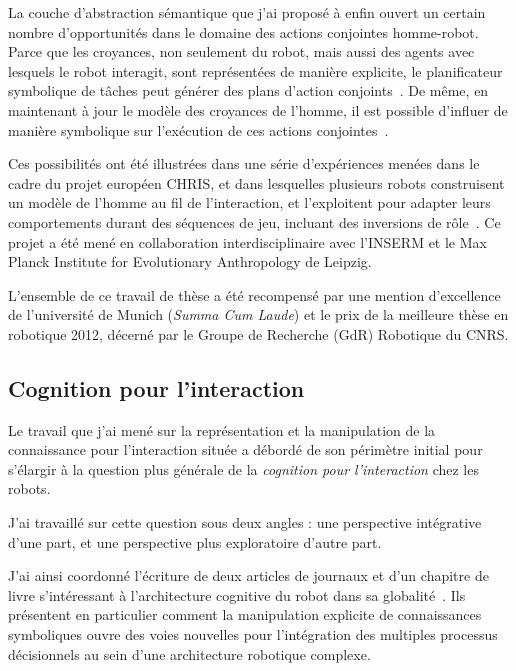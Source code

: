 \documentclass[a4paper]{article}
\begin{document}
La couche d'abstraction sémantique que j'ai proposé à enfin ouvert un certain
nombre d'opportunités dans le domaine des actions conjointes homme-robot. Parce
que les croyances, non seulement du robot, mais aussi des agents avec lesquels
le robot interagit, sont représentées de manière explicite, le planificateur
symbolique de tâches peut générer des plans d'action
conjoints~\cite{alami2011when, lemaignan2012bridges, clodic2013robot}. De même, en
maintenant à jour le modèle des croyances de l'homme, il est possible d'influer
de manière symbolique sur l'exécution de ces actions
conjointes~\cite{gharbi2013natural}.

Ces possibilités ont été illustrées dans une série d'expériences menées dans le
cadre du projet européen CHRIS, et dans lesquelles plusieurs robots construisent
un modèle de l'homme au fil de l'interaction, et l'exploitent pour adapter leurs
comportements durant des séquences de jeu, incluant des inversions de
rôle~\cite{lallee2010towards, lallee2011towards, lallee2012towards}. Ce projet a
été mené en collaboration interdisciplinaire avec l'INSERM et le Max Planck
Institute for Evolutionary Anthropology de Leipzig.

L'ensemble de ce travail de thèse a été recompensé par une mention d'excellence
de l'université de Munich (\emph{Summa Cum Laude}) et le prix de la meilleure
thèse en robotique 2012, décerné par le Groupe de Recherche (GdR) Robotique du CNRS.

\subsection*{Cognition pour l'interaction%
  \label{cognition-for-interaction}%
}

Le travail que j'ai mené sur la représentation et la manipulation de la
connaissance pour l'interaction située a débordé de son périmètre
initial pour s'élargir à la question plus générale de la \emph{cognition pour
l'interaction} chez les robots.

J'ai travaillé sur cette question sous deux angles : une perspective
intégrative d'une part, et une perspective plus exploratoire d'autre part.

J'ai ainsi coordonné l'écriture de deux articles de journaux et d'un chapitre de
livre s'intéressant à l'architecture cognitive du robot dans sa
globalité~\cite{alami2011when, lemaignan2012bridges, lemaignan2015human}. Ils
présentent en particulier comment la manipulation explicite de connaissances
symboliques ouvre des voies nouvelles pour l'intégration des multiples processus
décisionnels au sein d'une architecture robotique complexe.
\end{document}
